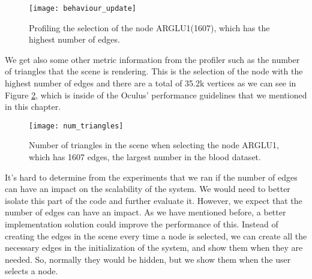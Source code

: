 \begin{figure}
    \centering%
    \texttt{[image: behaviour\_update]}
    \caption{Profiling the selection of the node ARGLU1(1607), which has the highest number of edges.}
    \label{fig:behaviour_update}
\end{figure}%

We get also some other metric information from the profiler such as the number of triangles that the scene is rendering. This is the selection of the node with the highest number of edges and there are a total of 35.2k vertices as we can see in Figure \ref{fig:num_triangles}, which is inside of the Oculus' performance guidelines that we mentioned in this chapter.

\begin{figure}
    \centering%
    \texttt{[image: num\_triangles]}
    \caption{Number of triangles in the scene when selecting the node ARGLU1, which has 1607 edges, the largest number in the blood dataset.}
    \label{fig:num_triangles}
\end{figure}%

It's hard to determine from the experiments that we ran if the number of edges can have an impact on the scalability of the system. We would need to better isolate this part of the code and further evaluate it. However, we expect that the number of edges can have an impact. As we have mentioned before, a better implementation solution could improve the performance of this. Instead of creating the edges in the scene every time a node is selected, we can create all the necessary edges in the initialization of the system, and show them when they are needed. So, normally they would be hidden, but we show them when the user selects a node.

%

